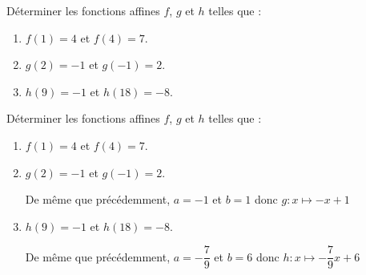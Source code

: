 \begin{exercice*}
    Déterminer les fonctions affines $f$, $g$ et $h$ telles que :
    \begin{enumerate}
        \item $f(1)=4$ et $f(4)=7$.
        \item $g(2)=-1$ et $g(-1)=2$.
        \item $h(9)=-1$ et $h(18)=-8$.
    \end{enumerate}
\end{exercice*}
\begin{corrige}
    Déterminer les fonctions affines $f$, $g$ et $h$ telles que :
    \begin{enumerate}
        \item $f(1)=4$ et $f(4)=7$.
        
        {\color{red} }
    \end{enumerate}
    \Coupe
    \begin{enumerate}
        \setcounter{enumi}{1}
        \item $g(2)=-1$ et $g(-1)=2$.
        
        {\color{red} %
        De même que précédemment, $a=-1$ et $b=1$ donc $g:x\longmapsto -x+1$}
        \item $h(9)=-1$ et $h(18)=-8$.
        
        {\color{red} %
        De même que précédemment, $a=-\dfrac79$ et $b=6$ donc $h:x\longmapsto -\dfrac79 x +6$
        }
    \end{enumerate}
\end{corrige}
